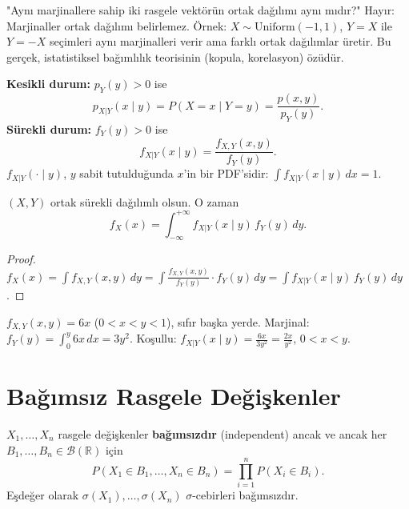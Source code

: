 \begin{kritiksorgu}
"Aynı marjinallere sahip iki rasgele vektörün ortak dağılımı aynı mıdır?"
Hayır: Marjinaller ortak dağılımı belirlemez.
Örnek: $X \sim \mathrm{Uniform}(-1,1)$, $Y = X$ ile $Y = -X$ seçimleri
aynı marjinalleri verir ama farklı ortak dağılımlar üretir.
Bu gerçek, istatistiksel bağımlılık teorisinin (kopula, korelasyon) özüdür.
\end{kritiksorgu}

\begin{tanim}
\label{def:kosullu_dagilim}
\textbf{Kesikli durum:} $p_Y(y) > 0$ ise
\[
  p_{X|Y}(x \mid y) = P(X = x \mid Y = y) = \frac{p(x,y)}{p_Y(y)}.
\]
\textbf{Sürekli durum:} $f_Y(y) > 0$ ise
\[
  f_{X|Y}(x \mid y) = \frac{f_{X,Y}(x,y)}{f_Y(y)}.
\]
$f_{X|Y}(\cdot \mid y)$, $y$ sabit tutulduğunda $x$'in bir PDF'sidir:
$\int f_{X|Y}(x \mid y) \, dx = 1$.
\end{tanim}

\begin{teorem}
\label{thm:toplam_surekli}
$(X, Y)$ ortak sürekli dağılımlı olsun. O zaman
\[
  f_X(x) = \int_{-\infty}^{+\infty} f_{X|Y}(x \mid y) \, f_Y(y) \, dy.
\]
\end{teorem}

\begin{proof}
$f_X(x) = \int f_{X,Y}(x,y) \, dy = \int \frac{f_{X,Y}(x,y)}{f_Y(y)} \cdot f_Y(y) \, dy
= \int f_{X|Y}(x \mid y) \, f_Y(y) \, dy$.
\end{proof}

\begin{ornek}
$f_{X,Y}(x,y) = 6x$ ($0 < x < y < 1$), sıfır başka yerde.
Marjinal: $f_Y(y) = \int_0^y 6x \, dx = 3y^2$.
Koşullu: $f_{X|Y}(x \mid y) = \frac{6x}{3y^2} = \frac{2x}{y^2}$, $0 < x < y$.
\end{ornek}

\section{Bağımsız Rasgele Değişkenler}
\label{sec:rd_bagimsizlik}

\begin{tanim}
\label{def:rd_bagimsiz}
$X_1, \ldots, X_n$ rasgele değişkenler \textbf{bağımsızdır} (independent)
ancak ve ancak her $B_1, \ldots, B_n \in \mathcal{B}(\mathbb{R})$ için
\[
  P(X_1 \in B_1, \ldots, X_n \in B_n) = \prod_{i=1}^n P(X_i \in B_i).
\]
Eşdeğer olarak $\sigma(X_1), \ldots, \sigma(X_n)$ $\sigma$-cebirleri bağımsızdır.
\end{tanim}

